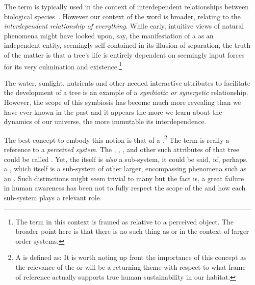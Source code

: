 \documentclass[10pt, a4paper, cleardoubleempty, openright, twoside]{book}
\begin{document}
The term  is typically used in the context of
interdependent relationships between biological
species~\cite{Dictionary:http:14a}. However our context of the word is
broader, relating to the \emph{interdependent relationship of
everything}. While early, intuitive views of natural phenomena might
have looked upon, say, the manifestation of a  as an
independent entity, seemingly self-contained in its illusion of
separation, the truth of the matter is that a tree's life is entirely
dependent on seemingly  input forces for its very
culmination and existence.\footnote{
	The term  in this context is framed as relative to
	a perceived object. The broader point here is that there is no such
	thing as  or  in the context
	of larger order systems.
}

The water, sunlight, nutrients and other needed interactive
 attributes to facilitate the development of a tree
is an example of a \emph{symbiotic or synergetic} relationship. However,
the scope of this symbiosis has become much more revealing than we have
ever known in the past and it appears the more we learn about the
dynamics of our universe, the more immutable its interdependence.

The best concept to embody this notion is that of a .\footnote{
	A  is defined as:  It is
	worth noting up front the importance of this concept as the relevance
	of the  or  will be a
	returning theme with respect to what frame of reference actually
	supports true human sustainability in our habitat.
} 
The term  is really a reference to a \emph{perceived
system}. The , , ,
 and other such attributes of that tree could be
called . Yet, the  itself is
\emph{also} a sub-system, it could be said, of, perhaps, a
, which itself is a sub-system of other larger,
encompassing phenomena such as an . Such
distinctions might seem trivial to many but the fact is, a great failure
in human awareness has been not to fully respect the scope of the
 and how each sub-system plays a relevant role.
\end{document}
